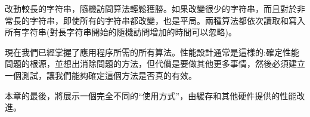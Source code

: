 改動較長的字符串，隨機訪問算法輕鬆獲勝。如果改變很少的字符串，而且對於非常長的字符串，即使所有的字符串都改變，也是平局。兩種算法都依次讀取和寫入所有字符串(對長字符串開始的隨機訪問增加的時間可以忽略)。

現在我們已經掌握了應用程序所需的所有算法。性能設計通常是這樣的:確定性能問題的根源，並想出消除問題的方法，但代價是要做其他更多事情，然後必須建立一個測試，讓我們能夠確定這個方法是否真的有效。

本章的最後，將展示一個完全不同的“使用方式”，由緩存和其他硬件提供的性能改進。




























